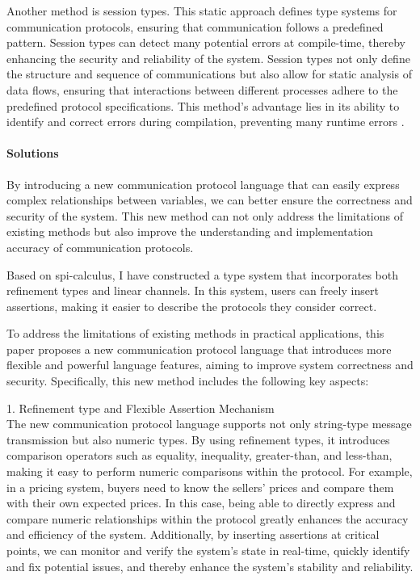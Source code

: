 \documentclass[master,english]{kuisthesis}
\begin{document}
Another method is session types. This static approach defines type systems for communication protocols, ensuring that communication follows a predefined pattern. Session types can detect many potential errors at compile-time, thereby enhancing the security and reliability of the system. Session types not only define the structure and sequence of communications but also allow for static analysis of data flows, ensuring that interactions between different processes adhere to the predefined protocol specifications. This method's advantage lies in its ability to identify and correct errors during compilation, preventing many runtime errors \cite{?}.





\paragraph{Solutions}

By introducing a new communication protocol language that can easily express complex relationships between variables, we can better ensure the correctness and security of the system. This new method can not only address the limitations of existing methods but also improve the understanding and implementation accuracy of communication protocols.

Based on spi-calculus, I have constructed a type system that incorporates both refinement types and linear channels. In this system, users can freely insert assertions, making it easier to describe the protocols they consider correct.






To address the limitations of existing methods in practical applications, this paper proposes a new communication protocol language that introduces more flexible and powerful language features, aiming to improve system correctness and security. Specifically, this new method includes the following key aspects:

1. Refinement type and Flexible Assertion Mechanism\\
The new communication protocol language supports not only string-type message transmission but also numeric types. By using refinement types, it introduces comparison operators such as equality, inequality, greater-than, and less-than, making it easy to perform numeric comparisons within the protocol. For example, in a pricing system, buyers need to know the sellers' prices and compare them with their own expected prices. In this case, being able to directly express and compare numeric relationships within the protocol greatly enhances the accuracy and efficiency of the system. Additionally, by inserting assertions at critical points, we can monitor and verify the system's state in real-time, quickly identify and fix potential issues, and thereby enhance the system's stability and reliability.
\end{document}

